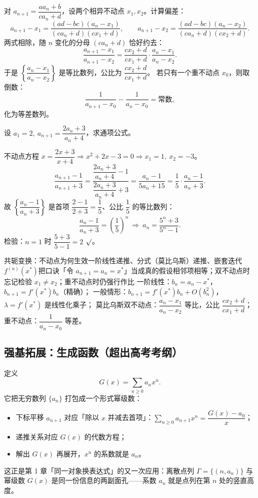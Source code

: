 \begin{explore}
对 $a_{n+1}=\dfrac{aa_n+b}{ca_n+d}$，设两个相异不动点 $x_1,x_2$。计算偏差：
\[
  a_{n+1}-x_1=\frac{(ad-bc)(a_n-x_1)}{(ca_n+d)(cx_1+d)},\qquad
  a_{n+1}-x_2=\frac{(ad-bc)(a_n-x_2)}{(ca_n+d)(cx_2+d)} .
\]
两式相除，随 $n$ 变化的分母 $(ca_n+d)$ 恰好约去：
\[
  \frac{a_{n+1}-x_1}{a_{n+1}-x_2}
  =\frac{cx_2+d}{cx_1+d}\cdot\frac{a_n-x_1}{a_n-x_2} .
\]
于是 $\left\{\dfrac{a_n-x_1}{a_n-x_2}\right\}$ 是等比数列，公比为 $\dfrac{cx_2+d}{cx_1+d}$。
若只有一个重不动点 $x_0$，则取倒数：
\[
  \frac1{a_{n+1}-x_0}-\frac1{a_n-x_0}=\text{常数},
\]
化为等差数列。

\begin{example}
设 $a_1=2,\ a_{n+1}=\dfrac{2a_n+3}{a_n+4}$，求通项公式。
\end{example}
\begin{solution}
不动点方程 $x=\dfrac{2x+3}{x+4}\Rightarrow x^2+2x-3=0\Rightarrow x_1=1,\ x_2=-3$。
\[
  \frac{a_{n+1}-1}{a_{n+1}+3}
  =\frac{\dfrac{2a_n+3}{a_n+4}-1}{\dfrac{2a_n+3}{a_n+4}+3}
  =\frac{a_n-1}{5a_n+15}
  =\frac15\cdot\frac{a_n-1}{a_n+3} .
\]
故 $\left\{\dfrac{a_n-1}{a_n+3}\right\}$ 是首项 $\dfrac{2-1}{2+3}=\dfrac15$、公比 $\dfrac15$ 的等比数列：
\[
  \frac{a_n-1}{a_n+3}=\left(\frac15\right)^n
  \ \Rightarrow\
  a_n=\frac{5^n+3}{5^n-1} .
\]
检验：$n=1$ 时 $\dfrac{5+3}{5-1}=2$ $\surd$。
\end{solution}

\begin{conccard}[二级]{共轭变换：不动点为何生效}{一阶线性递推、分式（莫比乌斯）递推、嵌套迭代 $f^{(n)}(x^*)$}{把口诀「令 $a_{n+1}=a_n=x^*$」当成真的假设相邻项相等；双不动点时忘记检验 $x_1\ne x_2$；重不动点时仍强行作比}
一阶线性：$b_n=a_n-x^*$，$b_{n+1}=f'(x^*)b_n$（精确）；
一般情形：$b_{n+1}=f'(x^*)b_n+O(b_n^2)$，$\lambda=f'(x^*)$ 是线性化乘子；
莫比乌斯双不动点：$\dfrac{a_n-x_1}{a_n-x_2}$ 等比，公比 $\dfrac{cx_2+d}{cx_1+d}$；
重不动点：$\dfrac1{a_n-x_0}$ 等差。
\end{conccard}

\subsection{强基拓展：生成函数（超出高考考纲）}



定义
\[
  G(x)=\sum_{n\ge0}a_nx^n .
\]
它把无穷数列 $\{a_n\}$ 打包成一个形式幂级数：
\begin{itemize}
  \item 下标平移 $a_{n+1}$ 对应「除以 $x$ 并减去首项」：$\sum_{n\ge0}a_{n+1}x^n=\dfrac{G(x)-a_0}{x}$；
  \item 递推关系对应 $G(x)$ 的代数方程；
  \item 解出 $G(x)$ 再展开，$x^n$ 的系数就是 $a_n$。
\end{itemize}
这正是第 1 章「同一对象换表达式」的又一次应用：离散点列 $\Gamma=\{(n,a_n)\}$ 与幂级数 $G(x)$ 是同一份信息的两副面孔——系数 $a_n$ 就是点列在第 $n$ 处的竖直高度。


\end{explore}
